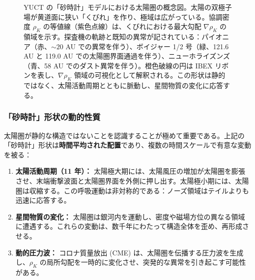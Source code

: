 \documentclass[11pt,a4paper]{article}
\theoremstyle{remark}
\begin{document}
\begin{figure}[htbp]
		\caption{YUCT の「砂時計」モデルにおける太陽圏の概念図。太陽の双極子場が黄道面に狭い「くびれ」を作り、極域は広がっている。協調密度 $\rho_K$ の等値線（紫色点線）は、くびれにおける最大勾配 $\nabla\rho_K$ の領域を示す。探査機の軌跡と既知の異常が記されている：パイオニア（赤、$\sim20$ AU での異常を伴う）、ボイジャー 1/2 号（緑、121.6 AU と 119.0 AU での太陽圏界面通過を伴う）、ニューホライズンズ（青、58 AU でのダスト異常を伴う）。橙色破線の円は IBEX リボンを表し、$\nabla\rho_K$ 領域の可視化として解釈される。この形状は静的ではなく、太陽活動周期とともに脈動し、星間物質の変化に応答する。}
		\label{fig:coord:heliosphere_hourglass}
	\end{figure}
	
	\subsubsection{「砂時計」形状の動的性質}
	\label{subsubsec:coord:dynamic}
	
	太陽圏が静的な構造ではないことを認識することが極めて重要である。上記の「砂時計」形状は\textbf{時間平均された配置}であり、複数の時間スケールで有意な変動を被る：
	
	\begin{enumerate}
		\item \textbf{太陽活動周期（11 年）：} 太陽極大期には、太陽風圧の増加が太陽圏を膨張させ、末端衝撃波面と太陽圏界面を外側に押し出す。太陽極小期には、太陽圏は収縮する。この呼吸運動は非対称的である：ノーズ領域はテイルよりも迅速に応答する。
		
		\item \textbf{星間物質の変化：} 太陽圏は銀河内を運動し、密度や磁場方位の異なる領域に遭遇する。これらの変動は、数千年にわたって構造全体を歪め、再形成させる。
		
		\item \textbf{動的圧力波：} コロナ質量放出 (CME) は、太陽圏を伝播する圧力波を生成し、$\rho_K$ の局所勾配を一時的に変化させ、突発的な異常を引き起こす可能性がある。
	\end{enumerate}
	
\end{document}
